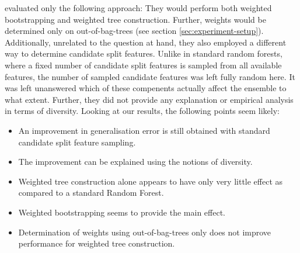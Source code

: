 \documentclass[../main.tex]{subfiles}
\begin{document}
\citeauthor{bernard-drf} evaluated only the following approach: They would perform both weighted bootstrapping and weighted tree construction. Further, weights would be determined only on out-of-bag-trees (see section \ref{sec:experiment-setup}). Additionally, unrelated to the question at hand, they also employed a different way to determine candidate split features. Unlike in standard random forests, where a fixed number of candidate split features is sampled from all available features, the number of sampled candidate features was left fully random here. It was left unanswered which of these compenents actually affect the ensemble to what extent. Further, they did not provide any explanation or empirical analysis in terms of diversity.
Looking at our results, the following points seem likely:
\begin{itemize}
    \item An improvement in generalisation error is still obtained with standard candidate split feature sampling.
    \item The improvement can be explained using the notions of diversity.
    \item Weighted tree construction alone appears to have only very little effect as compared to a standard Random Forest.
    \item Weighted bootstrapping seems to provide the main effect.
    \item Determination of weights using out-of-bag-trees only does not improve performance for weighted tree construction. 
\end{itemize}


\end{document}

